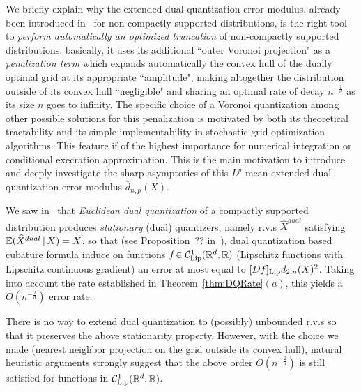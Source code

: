 We  briefly explain why the extended dual quantization error modulus,  already been  introduced in~\cite{dualStat} for non-compactly supported distributions, is the right  tool to {\em perform automatically an optimized truncation} of non-compactly supported distributions.  basically, it uses its  additional  ``outer Voronoi projection"   as a {\em penalization term}   which expands automatically the convex hull of the dually optimal   grid at its appropriate ``amplitude", making altogether   the distribution outside of its  convex hull  ``negligible"   and sharing  an optimal  rate of decay $n^{-\frac  1d}$ as its size $n$ goes to infinity. The specific choice of a Voronoi quantization among other possible  solutions  for this penalization is motivated by both  its   theoretical tractability and its simple implementability in stochastic grid optimization algorithms.
This feature if of the highest importance for numerical integration or conditional execration approximation. This is the main motivation  to introduce and deeply  investigate  the sharp asymptotics of  this   $L^p$-mean extended dual quantization error modulus  $\bar d_{n,p}(X)$. 

We saw in~\cite{dualStat} that {\em Euclidean  dual quantization}  of a compactly supported distribution produces {\em  stationary} (dual) quantizers, namely r.v.s $\widehat X^{dual}$ satisfying $\mathbb{E}(\widehat X^{dual}\,|\, X)=X$, so that (see Proposition~?? in~\cite{dualStat}), dual quantization based cubature formula induce on functions $f\!\in {\cal C}_{\rm Lip}^1(\mathbb{R}^d,\mathbb{R})$ (Lipschitz functions with Lipschitz continuous gradient) an error at most equal to $[D f]_{\rm Lip}d_{2,n}(X)^2$. Taking into account the rate established in Theorem~\ref{thm:DQRate}$(a)$, this yields  a $O(n^{-\frac{2}{d}})$ error rate.

There is no way to extend dual quantization to (possibly) unbounded r.v.s so that it preserves the above stationarity property. However, with the choice we made (nearest neighbor projection on the  grid outside its convex hull), natural heuristic arguments strongly suggest that the above order $O(n^{-\frac{2}{d}})$ is still satisfied for functions in  $ {\cal C}_{\rm Lip}^1(\mathbb{R}^d,\mathbb{R})$.


